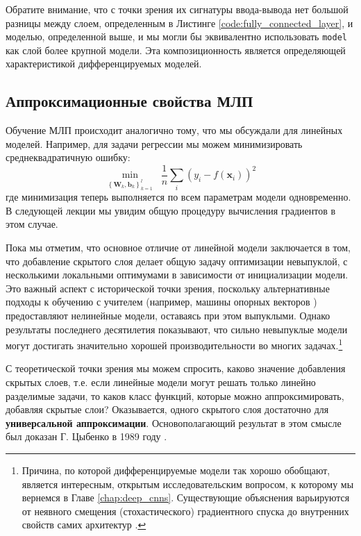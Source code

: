 Обратите внимание, что с точки зрения их сигнатуры ввода-вывода нет большой разницы между слоем, определенным в Листинге \ref{code:fully_connected_layer}, и моделью, определенной выше, и мы могли бы эквивалентно использовать \texttt{model} как слой более крупной модели. Эта композиционность является определяющей характеристикой дифференцируемых моделей.

\subsection{Аппроксимационные свойства МЛП} \addteacup

Обучение МЛП происходит аналогично тому, что мы обсуждали для линейных моделей. Например, для задачи регрессии мы можем минимизировать среднеквадратичную ошибку:
%
$$
\underset{\left\{\mathbf{W}_k, \mathbf{b}_k\right\}_{k=1}^l}{\min} \;\; \frac{1}{n}\sum_{i} \left(y_i - f(\mathbf{x}_i)\right)^2
$$
%
где минимизация теперь выполняется по всем параметрам модели одновременно. В следующей лекции мы увидим общую процедуру вычисления градиентов в этом случае. 

Пока мы отметим, что основное отличие от линейной модели заключается в том, что добавление скрытого слоя делает общую задачу оптимизации невыпуклой, с несколькими локальными оптимумами в зависимости от инициализации модели. Это важный аспект с исторической точки зрения, поскольку альтернативные подходы к обучению с учителем (например, машины опорных векторов \cite{hofmann2008kernel}) предоставляют нелинейные модели, оставаясь при этом выпуклыми. Однако результаты последнего десятилетия показывают, что сильно невыпуклые модели могут достигать значительно хорошей производительности во многих задачах.\footnote{Причина, по которой дифференцируемые модели так хорошо обобщают, является интересным, открытым исследовательским вопросом, к которому мы вернемся в Главе \ref{chap:deep_cnns}. Существующие объяснения варьируются от неявного смещения (стохастического) градиентного спуска \cite{pesme2021implicit} до внутренних свойств самих архитектур \cite{arpit2017closer,teney2024neural}.}

С теоретической точки зрения мы можем спросить, каково значение добавления скрытых слоев, т.е. если линейные модели могут решать только линейно разделимые задачи, то каков класс функций, которые можно аппроксимировать, добавляя скрытые слои? Оказывается, одного скрытого слоя достаточно для \textbf{универсальной аппроксимации}. Основополагающий результат в этом смысле был доказан Г. Цыбенко в 1989 году \cite{cybenko1989approximation}.

